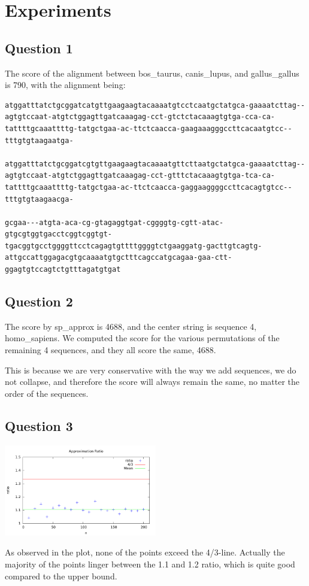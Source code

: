 \section{Experiments}

\subsection{Question 1}
The score of the alignment between bos_taurus, canis_lupus, and gallus_gallus is 790, with the alignment being: 

\begin{verbatim}
atggatttatctgcggatcatgttgaagaagtacaaaatgtcctcaatgctatgca-gaaaatcttag--agtgtccaat-atgtctggagttgatcaaagag-cct-gtctctacaaagtgtga-cca-ca-tattttgcaaattttg-tatgctgaa-ac-ttctcaacca-gaagaaagggccttcacaatgtcc--tttgtgtaagaatga-

atggatttatctgcggatcgtgttgaagaagtacaaaatgttcttaatgctatgca-gaaaatcttag--agtgtccaat-atgtctggagttgatcaaagag-cct-gtttctacaaagtgtga-tca-ca-tattttgcaaattttg-tatgctgaa-ac-ttctcaacca-gaggaaggggccttcacagtgtcc--tttgtgtaagaacga-

gcgaa---atgta-aca-cg-gtagaggtgat-cggggtg-cgtt-atac-gtgcgtggtgacctcggtcggtgt-tgacggtgcctggggttcctcagagtgttttggggtctgaaggatg-gacttgtcagtg-attgccattggagacgtgcaaaatgtgctttcagccatgcagaa-gaa-ctt-ggagtgtccagtctgtttagatgtgat
\end{verbatim}

\subsection{Question 2}
The score by sp_approx is 4688, and the center string is sequence 4, homo_sapiens.
We computed the score for the various permutations of the remaining 4 sequences, and they all score the same, 4688. 

This is because we are very conservative with the way we add sequences, we do not collapse, and therefore the score will always remain the same, no matter the order of the sequences. 

\subsection{Question 3}
\begin{center}
    \includegraphics[width=0.5\textwidth]{plot1.pdf}
\end{center}
As observed in the plot, none of the points exceed the 4/3-line. Actually the majority of the points linger between the 1.1 and 1.2 ratio, which is quite good compared to the upper bound. 